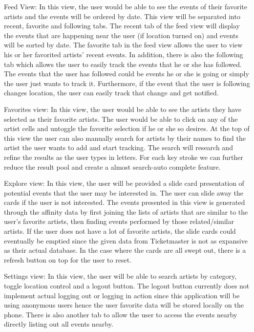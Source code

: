 		 Feed View: In this view, the user would be able to see the events of their favorite artists and the events 
		 will be ordered by date. This view will be separated into recent, favorite and following tabs. The recent 
		 tab of the feed view will display the events that are happening near the user (if location turned on) and 
		 events will be sorted by date. The favorite tab in the feed view allows the user to view his or her 
		 favorited artists’ recent events. In addition, there is also the following tab which allows the user to 
		 easily track the events that he or she has followed. The events that the user has followed could be 
		 events he or she is going or simply the user just wants to track it. Furthermore, if the event that the 
		 user is following changes location, the user can easily track that change and get notified.
		
		 Favorites view: In this view, the user would be able to see the artists they have selected as their favorite 
		 artists. The user would be able to click on any of the artist cells and untoggle the favorite selection if 
		 he or she so desires. At the top of this view the user can also manually search for artists by their names 
		 to find the artist the user wants to add and start tracking. The search will research and refine the results 
		 as the user types in letters. For each key stroke we can further reduce the result pool and create a 
		 almost search-auto complete feature.
		
		 Explore view: In this view, the user will be provided a slide card presentation of potential events that 
		 the user may be interested in. The user can slide away the cards if the user is not interested. The events 
		 presented in this view is generated through the affinity data by first joining the lists of artists that are 
		 similar to the user’s favorite artists, then finding events performed by those related/similar artists. If 
		 the user does not have a lot of favorite artists, the slide cards could eventually be emptied since the 
		 given data from Ticketmaster is not as expansive as their actual database. In the case where the cards 
		 are all swept out, there is a refresh button on top for the user to reset.
		
		 Settings view: In this view, the user will be able to search artists by category, toggle location control 
		 and a logout button. The logout button currently does not implement actual logging out or logging in 
		 action since this application will be using anonymous users hence the user favorite data will be stored 
		 locally on the phone. There is also another tab to allow the user to access the events nearby directly 
		 listing out all events nearby.
		
